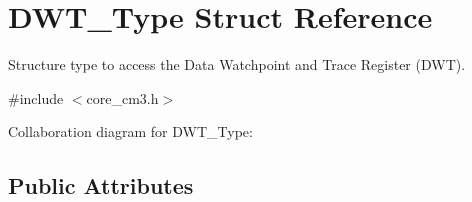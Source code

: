 \hypertarget{structDWT__Type}{}\section{D\+W\+T\+\_\+\+Type Struct Reference}
\label{structDWT__Type}


Structure type to access the Data Watchpoint and Trace Register (D\+WT).  




{\ttfamily \#include $<$core\+\_\+cm3.\+h$>$}



Collaboration diagram for D\+W\+T\+\_\+\+Type\+:
\subsection*{Public Attributes}
